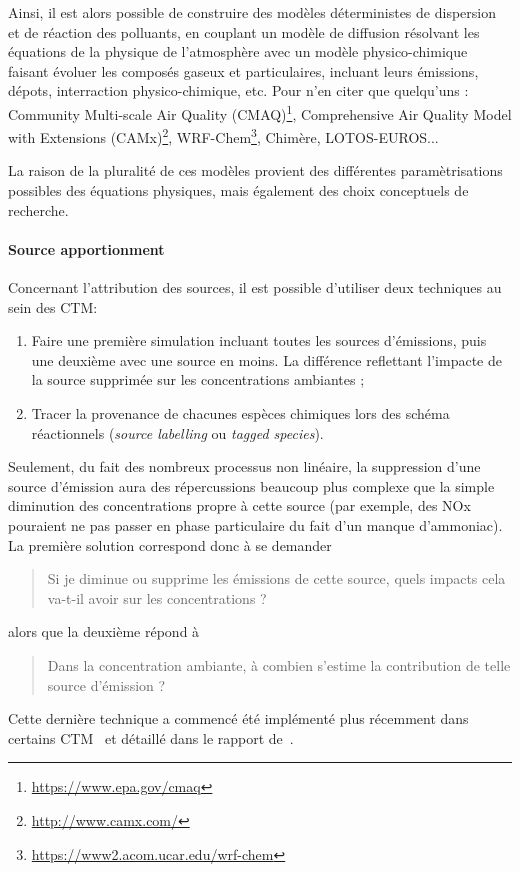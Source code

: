 Ainsi, il est alors possible de construire des modèles déterministes de dispersion et de
réaction des polluants, en couplant un modèle de diffusion résolvant les équations de la
physique de l'atmosphère avec un modèle physico-chimique faisant évoluer les composés
gaseux et particulaires, incluant leurs émissions, dépots, interraction physico-chimique,
etc. Pour n'en citer que quelqu'uns : 
Community Multi-scale Air Quality (CMAQ)\footnote{\url{https://www.epa.gov/cmaq}},
Comprehensive Air Quality Model with Extensions (CAMx)\footnote{\url{http://www.camx.com/}},
WRF-Chem\footnote{\url{https://www2.acom.ucar.edu/wrf-chem}},
Chimère,
LOTOS-EUROS...

La raison de la pluralité de ces modèles provient des différentes paramètrisations
possibles des équations physiques, mais également des choix conceptuels de recherche.

\paragraph{Source apportionment}%
\label{par:source_apportionment}

Concernant l'attribution des sources, il est possible d'utiliser deux techniques au sein
des CTM:

\begin{enumerate}
    \item Faire une première simulation incluant toutes les sources d'émissions, puis une
        deuxième avec une source en moins. La différence reflettant l'impacte de la source
        supprimée sur les concentrations ambiantes ;
    \item Tracer la provenance de chacunes espèces chimiques lors des schéma réactionnels
        (\textit{source labelling} ou \textit{tagged species}).
\end{enumerate}

Seulement, du fait des nombreux processus non linéaire, la suppression d'une source
d'émission aura des répercussions beaucoup plus complexe que la simple diminution des
concentrations propre à cette source (par exemple, des NOx pouraient ne pas passer en
phase particulaire du fait d'un manque d'ammoniac). La première solution correspond donc à
se demander 
\begin{quote}
    Si je diminue ou supprime les émissions de cette source, quels impacts cela va-t-il
    avoir sur les concentrations ?
\end{quote}
alors que la deuxième répond à
\begin{quote}
    Dans la concentration ambiante, à combien s'estime la contribution de telle source
    d'émission ?
\end{quote}
Cette dernière technique a commencé été implémenté plus récemment dans certains
CTM~\autocite{wangDevelopment2009,wagstromDevelopment2008,kranenburgSource2013,brandtContribution2013}
et détaillé dans le rapport de~\textcite{mirceaEuropean2020}.

